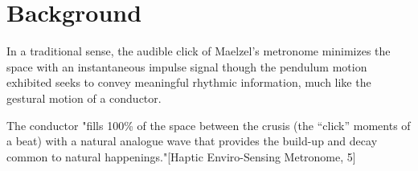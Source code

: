 
\chapter{Background} \label{chapBackground}

In a traditional sense, the audible click of Maelzel's metronome minimizes the space with an instantaneous impulse signal though the pendulum motion exhibited seeks to convey meaningful rhythmic information, much like the gestural motion of a conductor.

The conductor "fills 100\% of the space between the crusis (the “click” moments of a beat) with a natural analogue wave that provides the build-up and decay common to natural happenings."[Haptic Enviro-Sensing Metronome, 5]
